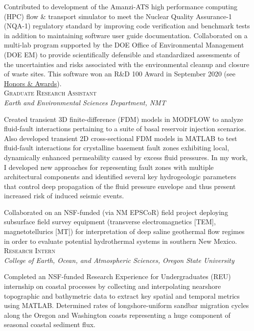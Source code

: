 \documentclass[11pt, letterpaper]{article}
\newcommand{\years}[1]{\marginnote{\scriptsize #1}}
\begin{document}
    Contributed to development of the Amanzi-ATS high performance computing
    (HPC) flow \& transport simulator to meet the Nuclear Quality Assurance-1
    (NQA-1) regulatory standard by improving code verification and benchmark
    tests in addition to maintaining software user guide documentation.
    Collaborated on a multi-lab program supported by the DOE Office of
    Environmental Management (DOE EM) to provide scientifically defensible and
    standardized assessments of the uncertainties and risks associated with the
    environmental cleanup and closure of waste sites. This software won an R\&D
    100 Award in September 2020 (see \hyperref[sec:awards]{Honors \&
    Awards}).\\

\noindent
\years{2016 - 2017}\textsc{Graduate Research Assistant}\\
\textit{Earth and Environmental Sciences Department, NMT}

    \vspace{3pt} \noindent  
	Created transient 3D finite-difference (FDM) models in MODFLOW to analyze
	fluid-fault interactions pertaining to a suite of basal reservoir
	injection scenarios. Also developed transient 2D cross-sectional FDM
	models in MATLAB to test fluid-fault interactions for crystalline basement
	fault zones exhibiting local, dynamically enhanced permeability caused by
	excess fluid pressures. In my work, I developed new approaches for
	representing fault zones with multiple architectural components and
	identified several key hydrogeologic parameters that control deep
	propagation of the fluid pressure envelope and thus present increased risk
	of induced seismic events.

	Collaborated on an NSF-funded (via NM EPSCoR) field project deploying
	subsurface field survey equipment (transverse electromagnetics [TEM],
	magnetotellurics [MT]) for interpretation of deep saline geothermal flow
	regimes in order to evaluate potential hydrothermal systems in southern New
	Mexico.\\

\noindent
\years{2013}\textsc{Research Intern}\\
\textit{College of Earth, Ocean, and Atmospheric Sciences, Oregon State University}

    \vspace{3pt} \noindent  
	Completed an NSF-funded Research Experience for Undergraduates (REU)
	internship on coastal processes by collecting and interpolating nearshore
	topographic and bathymetric data to extract key spatial and temporal
	metrics using MATLAB. Determined rates of longshore-uniform sandbar
	migration cycles along the Oregon and Washington coasts representing a huge
	component of seasonal coastal sediment flux.\\
\end{document}
